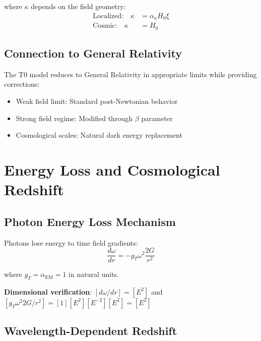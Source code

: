 \documentclass[twocolumn,aps,prl]{revtex4-2}
\begin{document}
	where \(\kappa\) depends on the field geometry:
	\begin{align}
		\text{Localized:} \quad \kappa &= \alpha_\kappa H_0 \xi \\
		\text{Cosmic:} \quad \kappa &= H_0
		\label{eq:kappa_values}
	\end{align}
	
	\subsection{Connection to General Relativity}
	\label{subsec:gr_connection}
	
	The T0 model reduces to General Relativity in appropriate limits while providing corrections:
	\begin{itemize}
		\item Weak field limit: Standard post-Newtonian behavior
		\item Strong field regime: Modified through \(\beta\) parameter
		\item Cosmological scales: Natural dark energy replacement
	\end{itemize}
	
	\section{Energy Loss and Cosmological Redshift}
	\label{sec:energy_loss_redshift}
	
	\subsection{Photon Energy Loss Mechanism}
	\label{subsec:photon_energy_loss}
	
	Photons lose energy to time field gradients:
	\begin{equation}
		\frac{d\omega}{dr} = -g_T \omega^2 \frac{2G}{r^2}
		\label{eq:energy_loss_rate}
	\end{equation}
	
	where \(g_T = \alpha_{\text{EM}} = 1\) in natural units.
	
	\textbf{Dimensional verification}: \([d\omega/dr] = [E^2]\) and \([g_T \omega^2 2G/r^2] = [1][E^2][E^{-2}][E^2] = [E^2]\) \checkmark
	
	\subsection{Wavelength-Dependent Redshift}
	\label{subsec:wavelength_redshift}
	
\end{document}
